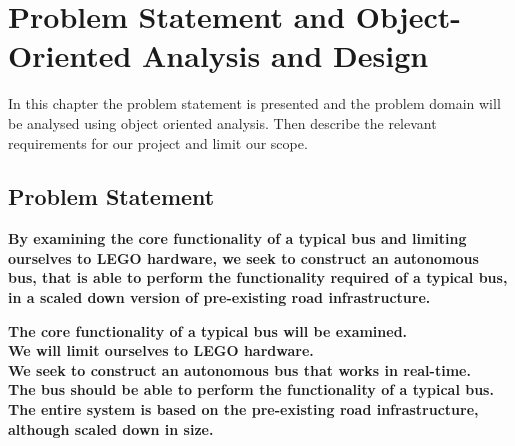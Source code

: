 \chapter{Problem Statement and Object-Oriented Analysis and Design}



In this chapter the problem statement is presented and the problem domain will be analysed using object oriented analysis. Then describe the relevant requirements for our project and limit our scope.

\section{Problem Statement}

\textbf{By examining the core functionality of a typical bus and limiting ourselves to LEGO hardware, we seek to construct an autonomous bus, that is able to perform the functionality required of a typical bus, in a scaled down version of pre-existing road infrastructure.}


\textbf{
The core functionality of a typical bus will be examined.\\
We will limit ourselves to LEGO hardware.\\
We seek to construct an autonomous bus that works in real-time.\\
The bus should be able to perform the functionality of a typical bus.\\
The entire system is based on the pre-existing road infrastructure, although scaled down in size.}



